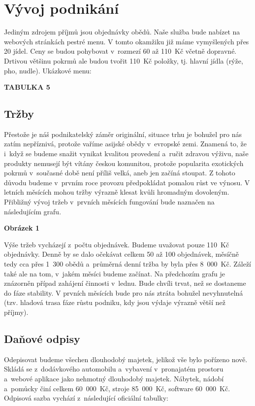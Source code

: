 \section{Vývoj podnikání}
Jediným zdrojem příjmů jsou objednávky obědů. Naše služba bude nabízet na webových stránkách pestré menu. V tomto okamžiku již máme vymyšlených přes 20 jídel. Ceny se budou pohybovat v~rozmezí 60 až 110~Kč včetně dopravné. Drtivou většinu pokrmů ale budou tvořit 110~Kč položky, tj. hlavní jídla (rýže, pho, nudle). Ukázkové menu:

\textbf{TABULKA 5}

\subsection{Tržby}
Přestože je náš podnikatelský záměr originální, situace trhu je bohužel pro nás zatím nepříznivá, protože vaříme asijské obědy v~evropské zemi. Znamená to, že i~když se budeme snažit vynikat kvalitou provedení a~ručit zdravou výživu, naše produkty nemusejí být vítány českou komunitou, protože popularita exotických pokrmů v~současné době není příliš velká, aneb jen začíná stoupat. Z tohoto důvodu budeme v~prvním roce provozu předpokládat pomalou růst ve výnosu. V letních měsících mohou tržby výrazně klesat kvůli hromadným dovoleným. Přibližný vývoj tržeb v~prvních měsících fungování bude naznačen na následujícím grafu.

\textbf{Obrázek 1}

Výše tržeb vycházejí z~počtu objednávek. Budeme uvažovat pouze 110~Kč objednávky. Denně by se dalo očekávat celkem 50 až 100 objednávek, měsíčně tedy cca přes 1~300 obědů a~průměrná denní tržba by byla přes 8~000~Kč. Záleží také ale na tom, v~jakém měsíci budeme začínat. Na předchozím grafu je znázorněn případ zahájení činnosti v~lednu. Bude chvíli trvat, než se dostaneme do fáze stability. V prvních měsících bude pro nás ztráta bohužel nevyhnutelná (tzv. hladová trasa fáze růstu podniku, kdy jsou výdaje výrazně větší než příjmy).

\subsection{Daňové odpisy}
Odepisovat budeme všechen dlouhodobý majetek, jelikož vše bylo pořízeno nově. Skládá se z~dodávkového automobilu a~vybavení v~pronajatém prostoru a~webové aplikace jako nehmotný dlouhodobý majetek. Nábytek, nádobí a~pomůcky činí celkem 60~000~Kč, stroje 85~000~Kč, software 60~000~Kč. Odpisová sazba vychází z~následující oficiální tabulky:

